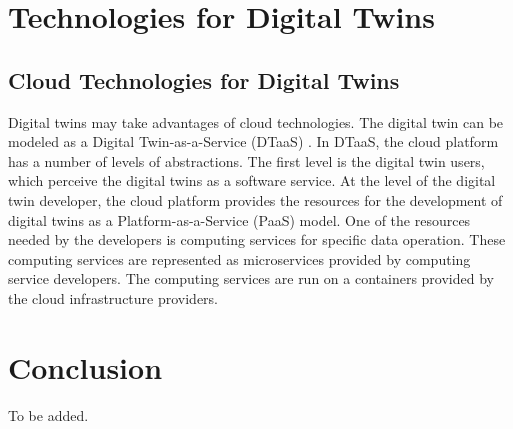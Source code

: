 \documentclass[article]{aaltoseries}
\begin{document}





\section{Technologies for Digital Twins}
\subsection{Cloud Technologies for Digital Twins}
Digital twins may take advantages of cloud technologies. The digital twin can be modeled as a Digital Twin-as-a-Service (DTaaS) \cite{borodulin2017towards}. In DTaaS, the cloud platform has a number of levels of abstractions. The first level is the digital twin users, which perceive the digital twins as a software service. At the level of the digital twin developer, the cloud platform provides the resources for the development of digital twins as a Platform-as-a-Service (PaaS) model. One of the resources needed by the developers is computing services for specific data operation. These computing services are represented as microservices provided by computing service developers. The computing services are run on a containers provided by the cloud infrastructure providers.




\section{Conclusion}

To be added.






\end{document}
